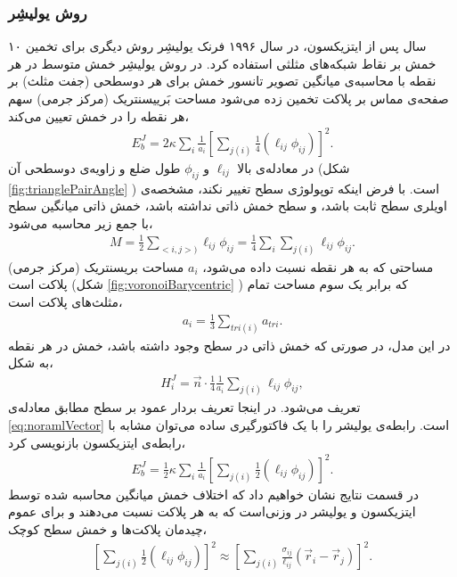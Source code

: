 \subsubsection{
روش یولیشِر
}
۱۰ سال پس از ایتزیکسون، در سال ۱۹۹۶ فرنک یولیشِر 
\cite{Julicher1996}
روش دیگری برای تخمین خمش بر نقاط شبکه‌های مثلثی استفاده کرد. در روش یولیشِر خمش متوسط در هر نقطه با محاسبه‌ی  میانگین تصویر تانسور خمش برای هر دوسطحی (جفت مثلث‌) بر صفحه‌ی مماس بر پلاکت  تخمین زده می‌شود
\cite{Ramakrishnan2011}
مساحت بَرییسنتریک
(مرکز جرمی) سهم هر نقطه را در خمش تعیین می‌کند،
\begin{eqnarray}
E_{b}^{J}=2\kappa\sum_{i}\frac{1}{a_i}\left[\sum_{j(i)}\frac{1}{4}(\ell_{ij}\phi_{ij})\right]^2.
\label{eq:JulicherPotential}
\end{eqnarray}
در معادله‌ی بالا 
$\ell_{ij}$
و
$\phi_{ij}$
طول ضلع و زاویه‌ی دوسطحی آن (شکل
\ref{fig:trianglePairAngle}
) است. با فرض اینکه توپولوژی سطح تغییر نکند، مشخصه‌ی اویلری سطح ثابت باشد، و سطح خمش ذاتی نداشته باشد، خمش ذاتی میانگین سطح با جمع زیر محاسبه می‌شود، 
\begin{eqnarray}
M=\frac{1}{2}\sum_{<i,j>)}\ell_{ij}\phi_{ij} = \frac{1}{4}\sum_i\sum_{j(i)}\ell_{ij}\phi_{ij}.
\label{eq:JulicherTotalMeanCurvature}
\end{eqnarray}
مساحتی که به هر نقطه نسبت داده می‌شود،
$a_i$
مساحت بریسنتریک (مرکز جرمی) پلاکت است (شکل
\ref{fig:voronoiBarycentric}
) که برابر یک سوم مساحت تمام مثلث‌های پلاکت است، 
\begin{eqnarray}
a_i=\frac{1}{3}\sum_{tri (i)}a_{tri}.
\label{eq:BarycentricArea}
\end{eqnarray}
در این مدل، در صورتی که خمش ذاتی در سطح وجود داشته باشد، خمش در هر نقطه به شکل،
\begin{eqnarray}
H_i^J=\vec n\cdot\frac{1}{4}\frac{1}{a_i}\sum_{j(i)}\ell_{ij}\phi_{ij},
\label{eq:meanCurvatureDiscreteSingleVertexJulicher}
\end{eqnarray}
تعریف می‌شود. در اینجا تعریف بردار عمود بر سطح مطابق معادله‌ی
\ref{eq:noramlVector}
است. رابطه‌ی یولیشر را با یک فاکتورگیری ساده می‌توان مشابه با رابطه‌ی ایتزیکسون بازنویسی کرد،
\begin{eqnarray}
E_{b}^{J}=\frac{1}{2}\kappa\sum_{i}\frac{1}{a_i}\left[\sum_{j(i)}\frac{1}{2}(\ell_{ij}\phi_{ij})\right]^2.
\label{eq:JulicherPotentialHalf}
\end{eqnarray}
در قسمت نتایج نشان خواهیم داد که اختلاف خمش میانگین محاسبه شده توسط ایتزیکسون و یولیشر در وزنی‌است که به هر پلاکت نسبت می‌دهند و برای عموم چیدمان‌ پلاکت‌ها و خمش سطح کوچک،
\begin{eqnarray}
\left[\sum_{j(i)}\frac{1}{2}(\ell_{ij}\phi_{ij})\right]^2\approx\left[\sum_{j(i)}\frac{\sigma_{ij}}{\ell_{ij}}(\vec r_i-\vec r_j)\right]^2.
\label{eq:JulicherItzyksonNumerator}
\end{eqnarray}


